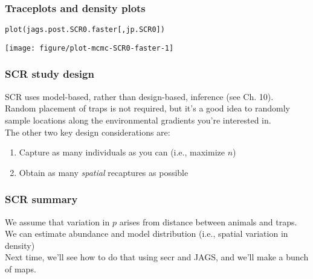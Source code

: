 \documentclass[color=usenames,dvipsnames]{beamer}\usepackage[]{graphicx}\usepackage[]{color}
\makeatletter
\newcommand{\hlstd}[1]{\textcolor[rgb]{0,0,0}{#1}}%
\newcommand{\hlkwd}[1]{\textcolor[rgb]{0.004,0.004,0.506}{#1}}%
\newenvironment{kframe}{%
 \def\at@end@of@kframe{}%
 \ifinner\ifhmode%
  \def\at@end@of@kframe{\end{minipage}}%
  \begin{minipage}{\columnwidth}%
 \fi\fi%
 \def\FrameCommand##1{\hskip\@totalleftmargin \hskip-\fboxsep
 \colorbox{shadecolor}{##1}\hskip-\fboxsep
     \hskip-\linewidth \hskip-\@totalleftmargin \hskip\columnwidth}%
 \MakeFramed {\advance\hsize-\width
   \@totalleftmargin\z@ \linewidth\hsize
   \@setminipage}}%
 {\par\unskip\endMakeFramed%
 \at@end@of@kframe}
\newenvironment{knitrout}{}{} %
\makeatother
\begin{document}
\begin{frame}[fragile]
  \frametitle{Traceplots and density plots}
\begin{knitrout}\footnotesize
{}\color{fgcolor}\begin{kframe}
\begin{alltt}
\hlkwd{plot}\hlstd{(jags.post.SCR0.faster[,jp.SCR0])}
\end{alltt}
\end{kframe}

{\centering \texttt{[image: figure/plot-mcmc-SCR0-faster-1]} 

}


\end{knitrout}
\end{frame}




\begin{frame}
  \frametitle{SCR study design}
  SCR uses model-based, rather than design-based,
  inference (see Ch. 10). \\ 
  \pause
  \vfill
  Random placement of traps is not required, but it's a good idea to
  randomly sample locations along the environmental gradients you're
  interested in. \\
  \pause \vfill
  The other two key design considerations are:
  \begin{enumerate}
    \item<3-> Capture as many individuals as you can (i.e., maximize $n$)
    \item<4-> Obtain as many {\it spatial} recaptures as possible
  \end{enumerate}
  \vfill
\end{frame}



\begin{frame}
  \frametitle{SCR summary}
  We assume that variation in $p$ arises from distance between animals
  and traps. \\
  \pause \vfill
  We can estimate abundance and model distribution (i.e., spatial
  variation in density) \\
  \pause \vfill
  Next time, we'll see how to do that using secr and JAGS, and we'll
  make a bunch of maps. \\
\end{frame}
\end{document}

